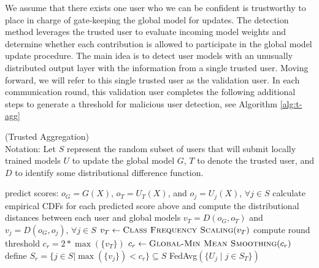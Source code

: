 \documentclass{article} %
\begin{document}
We assume that there exists one user who we can be confident is trustworthy to place in charge of gate-keeping the global model for updates. The detection method leverages the trusted user to evaluate incoming model weights and determine whether each contribution is allowed to participate in the global model update procedure. The main idea is to detect user models with an unusually distributed output layer with the information from a single trusted user. Moving forward, we will refer to this single trusted user as the validation user. In each communication round, this validation user completes the following additional steps to generate a threshold for malicious user detection, see Algorithm \ref{alg:t-agg}

\begin{algorithm}[H]
\caption{ (Trusted Aggregation) \\ 
Notation: Let $S$ represent the random subset of users that will submit locally trained models $U$ to update the global model $G$, $T$ to denote the trusted user, and $D$ to identify some distributional difference function.
}
\label{alg:t-agg}
\begin{algorithmic}[1]

            \State predict scores: $o_G = G(X)$, $o_{T} = U_T(X)$, and $o_j = U_j(X)$, $\forall j \in S$
            \State calculate empirical CDFs for each predicted score above 
            \State \quad and compute the distributional distances between each user and global models 
            \State \quad $v_T = D(o_G, o_T)$ and $v_{j} = D(o_G, o_{j})$, $\forall j \in S$
            \State $v_T \gets \Call{Class Frequency Scaling}{v_T}$  
        \EndFor
        \State compute round threshold $c_r = 2 * \max ( \{v_T\} )$
        \State  $c_r \gets \Call{Global-Min Mean Smoothing}{c_r}$  
        \State define $S_r = \{j \in S | \max (\{v_{j}\}) < c_r \} \subseteq S$
        \State \Return FedAvg$(\{U_j \mid j \in S_T \})$ 
    \EndProcedure
\end{algorithmic}
\end{algorithm}


%
\end{document}

